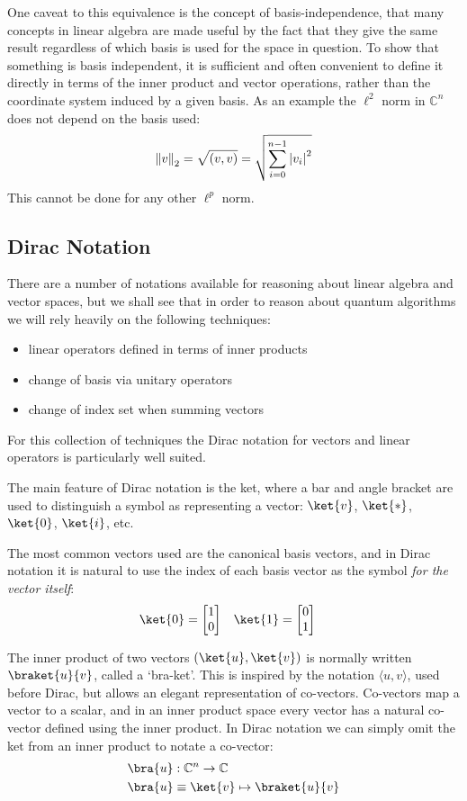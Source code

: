 One caveat to this equivalence is the concept of basis-independence, that many concepts in linear algebra are made useful by the fact that they give the same result regardless of which basis is used for the space in question. To show that something is basis independent, it is sufficient and often convenient to define it directly in terms of the inner product and vector operations, rather than the coordinate system induced by a given basis. As an example the $\ell^2$ norm in $\mathbb{C}^n$ does not depend on the basis used:
\[\left\Vert v \right\Vert_2 = \sqrt{(v, v)} = \sqrt{\sum_{i=0}^{n-1}\left| v_i \right|^2}\]
This cannot be done for any other $\ell^p$ norm.

\subsection{Dirac Notation}\label{dirac}
There are a number of notations available for reasoning about linear algebra and vector spaces, but we shall see that in order to reason about quantum algorithms we will rely heavily on the following techniques:
\begin{itemize}
	\item linear operators defined in terms of inner products
	\item change of basis via unitary operators
	\item change of index set when summing vectors
\end{itemize}
For this collection of techniques the Dirac notation for vectors and linear operators is particularly well suited.

The main feature of Dirac notation is the ket, where a bar and angle bracket are used to distinguish a symbol as representing a vector: $\ket{v}$, $\ket{*}$, $\ket{0}$, $\ket{i}$, etc.

The most common vectors used are the canonical basis vectors, and in Dirac notation it is natural to use the index of each basis vector as the symbol \textit{for the vector itself}:
\begin{align*}
	\ket{0} = \left[\begin{matrix}
		1\\
		0
	\end{matrix}\right]
	&&&
	\ket{1} = \left[\begin{matrix}
		0\\
		1
	\end{matrix}\right]
\end{align*}

The inner product of two vectors $(\ket{u}, \ket{v})$ is normally written $\braket{u}{v}$, called a `bra-ket'. This is inspired by the notation $\langle u, v\rangle$, used before Dirac, but allows an elegant representation of co-vectors. Co-vectors map a vector to a scalar, and in an inner product space every vector has a natural co-vector defined using the inner product. In Dirac notation we can simply omit the ket from an inner product to notate a co-vector:
\begin{align*}
	\bra{u} &: \mathbb{C}^n \to \mathbb{C}
	\\\bra{u} &\equiv \ket{v} \mapsto \braket{u}{v}
\end{align*}

